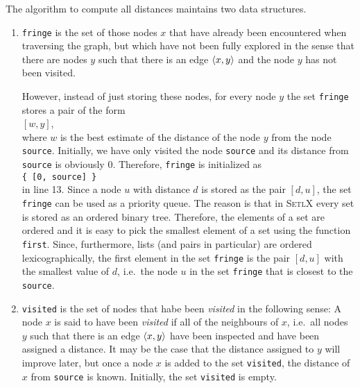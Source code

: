The algorithm to compute all distances maintains two data structures.
\begin{enumerate}
\item \texttt{fringe} is the set of those nodes $x$ that have already been encountered when traversing
      the graph, but which have not been fully explored in the sense that there are nodes $y$ such
      that there is an edge $\pair(x,y)$ and the node $y$ has not been visited.
      
      However, instead of just storing these nodes, for every node $y$ the set \texttt{fringe} stores a pair
      of the form 
      \\[0.2cm]
      \hspace*{1.3cm}
      $[w, y]$,
      \\[0.2cm]
      where $w$ is the best estimate of the distance of the node $y$ from the node \texttt{source}.
      Initially, we have only visited the node \texttt{source} and its distance from \texttt{source}
      is obviously $0$.  Therefore, \texttt{fringe} is initialized as
      \\[0.2cm]
      \hspace*{1.3cm}
      \texttt{\{ [0, source] \}}
      \\[0.2cm]
      in line 13.  Since a node $u$ with distance $d$ is stored as the pair $[d, u]$, the set
      \texttt{fringe} can be used as a priority queue.  The reason is that in \textsc{SetlX} every
      set is stored as an ordered binary tree.  Therefore, the elements of a set are ordered and it
      is easy to pick the smallest element of a set using the function \texttt{first}.  
      Since, furthermore, lists (and pairs in
      particular) are ordered lexicographically, the first element in the set \texttt{fringe} is 
      the pair $[d, u]$ with the smallest value of $d$, i.e.~the node $u$ in the set \texttt{fringe}
      that is closest to the \texttt{source}.
\item \texttt{visited} is the set of nodes that habe been \emph{visited} in the following sense:
      A node $x$ is said to have been \emph{visited} if all of the neighbours of $x$, i.e.~all nodes
      $y$ such that there is an edge $\pair(x,y)$ have been inspected and have been assigned a 
      distance.  It may be the case that the distance assigned to $y$ will improve later,
      but once a node $x$ is added to the set \texttt{visited}, the distance of $x$ from
      \texttt{source} is known.  Initially, the set \texttt{visited} is empty.
\end{enumerate}
